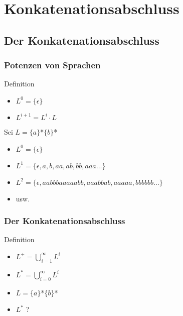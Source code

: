 \documentclass{beamer}
\begin{document}
\section{Konkatenationsabschluss}
\subsection[Der Konkatenationsabschluss]{Der Konkatenationsabschluss}
\begin{frame}
	\frametitle{Potenzen von Sprachen}
	\begin{block}{Definition}
		\begin{itemize}
			\item $L^{0} = \{\epsilon\}$
			\item $L^{i+1} = L^{i} \cdot L$
		\end{itemize}
	\end{block}
	\begin{example}
		Sei $L = \{a\}$*$\{b\}$*
		\begin{itemize}[<+->]
			\item $L^{0} = \{\epsilon\}$
			\item $L^{1} = \{\epsilon,a,b,aa,ab,bb,aaa\ldots\}$
			\item $L^{2} = \{\epsilon,aabbbaaaaabb,aaabbab,aaaaa,bbbbbb\ldots\}$
			\item usw.
		\end{itemize}
	\end{example}
\end{frame}

\begin{frame}
	\frametitle{Der Konkatenationsabschluss}
	\begin{block}{Definition}
		\begin{itemize}[<+->]
			\item $L^{+} = \bigcup\limits_{i = 1}^{\infty} L^{i}$
			\item $L^{*} = \bigcup\limits_{i = 0}^{\infty} L^{i}$
		\end{itemize}
	\end{block}
	\begin{example}
		\begin{itemize}[<+->]
			\item $L = \{a\}$*$\{b\}$*
			\item $L^{*}$ ? \visible<5->{ = $\{a,b\}$*}
		\end{itemize}
	\end{example}
\end{frame}
\end{document}
